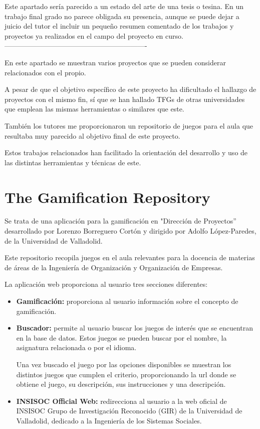 
Este apartado sería parecido a un estado del arte de una tesis o tesina. En un trabajo final grado no parece obligada su presencia, aunque se puede dejar a juicio del tutor el incluir un pequeño resumen comentado de los trabajos y proyectos ya realizados en el campo del proyecto en curso. 
-------------------------------------------------------------

En este apartado se muestran varios proyectos que se pueden considerar relacionados con el propio.

A pesar de que el objetivo específico de este proyecto ha dificultado el hallazgo de proyectos con el mismo fin, sí que se han hallado TFGs de otras universidades que emplean las mismas herramientas o similares que este.

También los tutores me proporcionaron un repositorio de juegos para el aula que resultaba muy parecido al objetivo final de este proyecto.

Estos trabajos relacionados han facilitado la orientación del desarrollo y uso de las distintas herramientas y técnicas de este.

\section{The Gamification Repository}
\cite{Repositorio} Se trata de una aplicación para la gamificación en "Dirección de Proyectos” desarrollado por Lorenzo Borreguero Cortón y dirigido por Adolfo López-Paredes, de la Universidad de Valladolid.

Este repositorio recopila juegos en el aula relevantes para la docencia de materias de áreas de la Ingeniería de Organización y Organización de Empresas. 

La aplicación web \cite{wordpress} proporciona al usuario tres secciones diferentes:
\begin{itemize}
    \item\textbf{Gamificación:} proporciona al usuario información sobre el concepto de gamificación.
    \item\textbf{Buscador:} permite al usuario buscar los juegos de interés que se encuentran en la base de datos. Estos juegos se pueden buscar por el nombre, la asignatura relacionada o por el idioma. 
    
    Una vez buscado el juego por las opciones disponibles se muestran los distintos juegos que cumplen el criterio, proporcionando la url donde se obtiene el juego, su descripción, sus instrucciones y una descripción.
    \item\textbf{INSISOC Official Web:} redirecciona al usuario a la web oficial de INSISOC Grupo de Investigación Reconocido (GIR) de la Universidad de Valladolid, dedicado a la Ingeniería de los Sistemas Sociales.    
\end{itemize}

